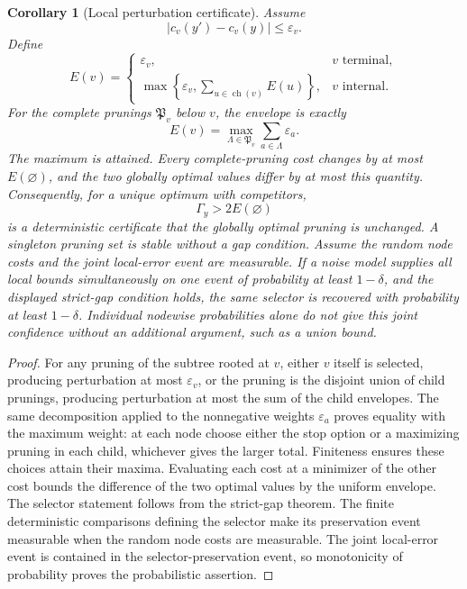 \documentclass[11pt,letterpaper]{article}
\theoremstyle{plain}
\theoremstyle{plain}
\theoremstyle{plain}
\newtheorem{corollary}[corollary]{Corollary}
\theoremstyle{definition}
\theoremstyle{definition}
\theoremstyle{definition}
\theoremstyle{definition}
\theoremstyle{remark}
\theoremstyle{remark}
\theoremstyle{remark}
\theoremstyle{remark}
\begin{document}
\begin{corollary}[Local perturbation certificate]\label{result:16}
Assume
\[
|c_v(y')-c_v(y)|\le\varepsilon_v.
\]
Define
\[
E(v)
=
\begin{cases}
\varepsilon_v,&v\text{ terminal},\\[1mm]
\displaystyle
\max\left\{\varepsilon_v,
\sum_{u\in\operatorname{ch}(v)}E(u)\right\},&v\text{ internal}.
\end{cases}
\]
For the complete prunings $\mathfrak P_v$ below $v$, the envelope is exactly
\[
E(v)=\max_{\Lambda\in\mathfrak P_v}\sum_{a\in\Lambda}\varepsilon_a.
\]
The maximum is attained. Every complete-pruning cost changes by at most $E(\varnothing)$, and the two globally optimal values differ by at most this quantity. Consequently, for a unique optimum with competitors,
\[
\boxed{\Gamma_y>2E(\varnothing)}
\]
is a deterministic certificate that the globally optimal pruning is unchanged.  A singleton pruning set is stable without a gap condition. Assume the random node costs and the joint local-error event are measurable. If a noise model supplies \emph{all} local bounds simultaneously on one event of probability at least $1-\delta$, and the displayed strict-gap condition holds, the same selector is recovered with probability at least $1-\delta$. Individual nodewise probabilities alone do not give this joint confidence without an additional argument, such as a union bound.
\end{corollary}

\begin{proof}
For any pruning of the subtree rooted at $v$, either $v$ itself is selected, producing perturbation at most $\varepsilon_v$, or the pruning is the disjoint union of child prunings, producing perturbation at most the sum of the child envelopes.  The same decomposition applied to the nonnegative weights $\varepsilon_a$ proves equality with the maximum weight: at each node choose either the stop option or a maximizing pruning in each child, whichever gives the larger total. Finiteness ensures these choices attain their maxima. Evaluating each cost at a minimizer of the other cost bounds the difference of the two optimal values by the uniform envelope. The selector statement follows from the strict-gap theorem. The finite deterministic comparisons defining the selector make its preservation event measurable when the random node costs are measurable. The joint local-error event is contained in the selector-preservation event, so monotonicity of probability proves the probabilistic assertion.
\end{proof}
\end{document}
